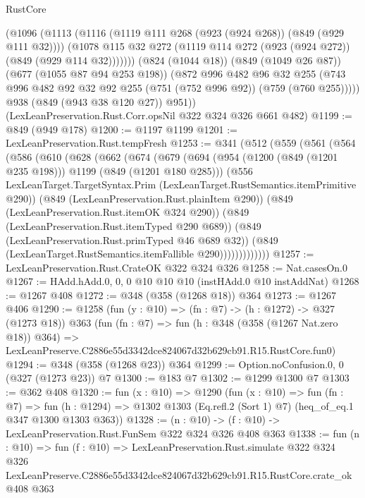 \begin{lexlean}{RustCore}
\begin{coremodule}
            (@1096
              (@1113
                (@1116 (@1119 @111 @268 (@923 (@924 @268)) (@849 (@929 @111 @32))))
                (@1078 @115 @32 @272 (@1119 @114 @272 (@923 (@924 @272)) (@849 (@929 @114 @32)))))))
          (@824 (@1044 @18))
          (@849 (@1049 @26 @87))
          (@677 (@1055 @87 @94 @253 @198))
          (@872
            @996
            @482
            @96
            @32
            @255
            (@743 @996 @482 @92 @32 @92 @255 (@751 (@752 @996 @92)) (@759 (@760 @255)))))
        @938
        (@849 (@943 @38 @120 @27))
        @951))
    (LexLeanPreservation.Rust.Corr.opsNil @322 @324 @326 @661 @482)
@1199 := @849 (@949 @178)
@1200 := @1197 @1199
@1201 := LexLeanPreservation.Rust.tempFresh
@1253 := @341
    (@512
      (@559
        (@561
          (@564
            (@586
              (@610
                (@628
                  (@662
                    (@674
                      (@679
                        (@694
                          (@954 (@1200 (@849 (@1201 @235 @198))) @1199 (@849 (@1201 @180 @285)))
                          (@556
                            LexLeanTarget.TargetSyntax.Prim
                            (LexLeanTarget.RustSemantics.itemPrimitive @290))
                          (@849 (LexLeanPreservation.Rust.plainItem @290))
                          (@849 (LexLeanPreservation.Rust.itemOK @324 @290))
                          (@849 (LexLeanPreservation.Rust.itemTyped @290 @689))
                          (@849 (LexLeanPreservation.Rust.primTyped @46 @689 @32))
                          (@849 (LexLeanTarget.RustSemantics.itemFallible @290)))))))))))))
@1257 := LexLeanPreservation.Rust.CrateOK @322 @324 @326
@1258 := Nat.casesOn.{0}
@1267 := HAdd.hAdd.{0, 0, 0} @10 @10 @10 (instHAdd.{0} @10 instAddNat)
@1268 := @1267 @408
@1272 := @348 (@358 (@1268 @18)) @364
@1273 := @1267 @406
@1290 := @1258
    (fun (y : @10) => (fn : @7) -> (h : @1272) -> @327 (@1273 @18))
    @363
    (fun (fn : @7) =>
    fun (h : @348 (@358 (@1267 Nat.zero @18)) @364) =>
    LexLeanPreserve.C2886e55d3342dce824067d32b629cb91.R15.RustCore.fun0)
@1294 := @348 (@358 (@1268 @23)) @364
@1299 := Option.noConfusion.{0, 0} (@327 (@1273 @23)) @7
@1300 := @183 @7
@1302 := @1299 @1300 @7
@1303 := @362 @408
@1320 := fun (x : @10) =>
  @1290
    (fun (x : @10) =>
    fun (fn : @7) =>
    fun (h : @1294) => @1302 @1303 (Eq.refl.{2} (Sort 1) @7) (heq_of_eq.{1} @347 @1300 @1303 @363))
@1328 := (n : @10) -> (f : @10) -> LexLeanPreservation.Rust.FunSem @322 @324 @326 @408 @363
@1338 := fun (n : @10) =>
  fun (f : @10) =>
  LexLeanPreservation.Rust.simulate
    @322
    @324
    @326
    LexLeanPreserve.C2886e55d3342dce824067d32b629cb91.R15.RustCore.crate_ok
    @408
    @363
\end{coremodule}
\end{lexlean}
